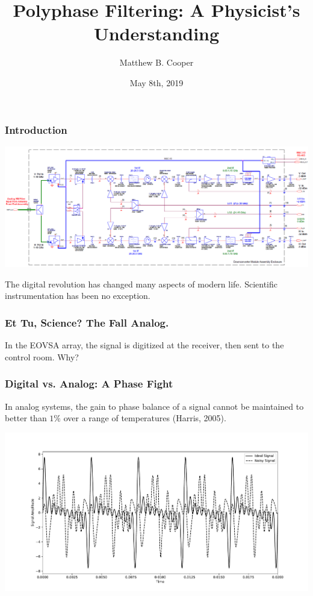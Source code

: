 \documentclass{beamer}
\title[About Beamer]
{Polyphase Filtering:  A Physicist's Understanding}
\author{Matthew B. Cooper}
\institute{New Jersey Institute of Technology}
\date{May 8th, 2019}
\begin{document}
 
\frame{\titlepage}
 
\begin{frame}
\frametitle{Introduction}
\includegraphics[scale=.25]{Figure_1.png}\footnotemark

\smallskip
The digital revolution has changed many aspects of modern life.  Scientific instrumentation has been no exception.  
\end{frame}

\begin{frame}
\frametitle{Et Tu, Science? The Fall Analog.}
In the EOVSA array, the signal is digitized at the receiver, then sent to the control room.  Why? 
\end{frame}

\begin{frame}
\frametitle{Digital vs. Analog: A Phase Fight}
In analog systems, the gain to phase balance of a signal cannot be maintained to better than $1\%$ over a range of temperatures (Harris, 2005).\footnotemark

\includegraphics[scale=.35]{Figure_2.pdf}
\end{frame}
\end{document}
